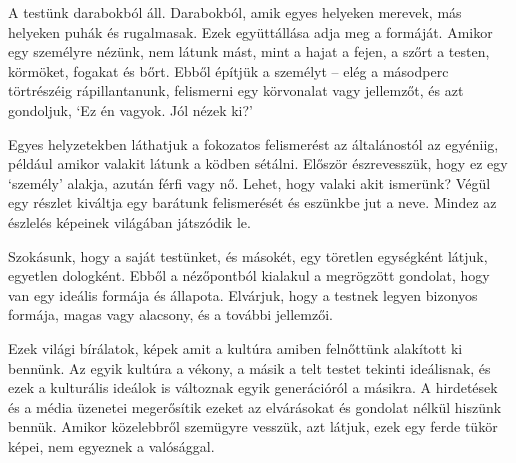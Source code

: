 A testünk darabokból áll. Darabokból, amik egyes helyeken merevek, más
helyeken puhák és rugalmasak. Ezek együttállása adja meg a formáját.
Amikor egy személyre nézünk, nem látunk mást, mint a hajat a fejen, a
szőrt a testen, körmöket, fogakat és bőrt. Ebből építjük a személyt --
elég a másodperc törtrészéig rápillantanunk, felismerni egy körvonalat
vagy jellemzőt, és azt gondoljuk, `Ez én vagyok. Jól nézek ki?'

Egyes helyzetekben láthatjuk a fokozatos felismerést az általánostól az
egyéniig, például amikor valakit látunk a ködben sétálni. Először
észrevesszük, hogy ez egy `személy' alakja, azután férfi vagy nő. Lehet,
hogy valaki akit ismerünk? Végül egy részlet kiváltja egy barátunk
felismerését és eszünkbe jut a neve. Mindez az észlelés képeinek
világában játszódik le.

Szokásunk, hogy a saját testünket, és másokét, egy töretlen egységként
látjuk, egyetlen dologként. Ebből a nézőpontból kialakul a megrögzött
gondolat, hogy van egy ideális formája és állapota. Elvárjuk, hogy a
testnek legyen bizonyos formája, magas vagy alacsony, és a további
jellemzői.

Ezek világi bírálatok, képek amit a kultúra amiben felnőttünk alakított
ki bennünk. Az egyik kultúra a vékony, a másik a telt testet tekinti
ideálisnak, és ezek a kulturális ideálok is változnak egyik generációról
a másikra. A hirdetések és a média üzenetei megerősítik ezeket az
elvárásokat és gondolat nélkül hiszünk bennük. Amikor közelebbről
szemügyre vesszük, azt látjuk, ezek egy ferde tükör képei, nem egyeznek
a valósággal.

\clearpage

\enlargethispage*{3\baselineskip}

